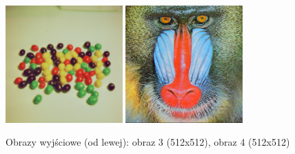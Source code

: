 \documentclass[final,a4paper,openany,12pt]{mwbk}
\begin{document}
\begin{figure}[H]
	\begin{center}
		\includegraphics[width=0.4\textwidth]{candy_color_unificationRas_result}
		\includegraphics[width=0.4\textwidth]{mandrill_color_unificationRas_result}
	\end{center}
	\caption{Obrazy wyjściowe (od lewej): obraz 3 (512x512), obraz 4 (512x512)}
\end{figure}

\end{document}
